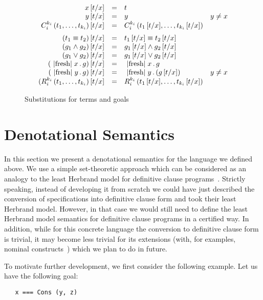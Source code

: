 \begin{figure}[t]
\[
\begin{array}{rcll}
  x\,[t/x] &=& t &\\
  y\,[t/x] &=& y & y\ne x\\
  C_i^{k_i}\,(t_1,\dots,t_{k_i})\,[t/x]&=&C_i^{k_i}\,(t_1\,[t/x],\dots,t_{k_i}\,[t/x])&\\[2mm]
  (t_1 \equiv t_2)\,[t/x]&=&t_1\,[t/x] \equiv t_2\,[t/x]&\\
  (g_1 \wedge g_2)\,[t/x]&=&g_1\,[t/x] \wedge g_2\,[t/x]&\\
  (g_1 \vee g_2)\,[t/x]&=&g_1\,[t/x] \vee g_2\,[t/x]&\\
  (\mbox{\lstinline|fresh|}\;x\,.\,g)\,[t/x]&=&\mbox{\lstinline|fresh|}\;x\,.\,g&\\
  (\mbox{\lstinline|fresh|}\;y\,.\,g)\,[t/x]&=&\mbox{\lstinline|fresh|}\;y\,.\,(g\,[t/x])&y\ne x\\
  (R_i^{k_i}\,(t_1,\dots,t_{k_i})\,[t/x]&=&R_i^{k_i}\,(t_1\,[t/x],\dots,t_{k_i}\,[t/x])&
\end{array}
\]
  \caption{Substitutions for terms and goals}
  \label{substitution}
\end{figure}

\section{Denotational Semantics}
\label{denotational}

In this section we present a denotational semantics for the language we defined above. We use a simple set-theoretic
approach which can be considered as an analogy to the least Herbrand model for definitive clause programs~\cite{LHM}.
Strictly speaking, instead of developing it from scratch we could have just described the conversion of specifications
into definitive clause form and took their least Herbrand model. However, in that case we would still need to define
the least Herbrand model semantics for definitive clause programs in a certified way. In addition, while for
this concrete language the conversion to definitive clause form is trivial, it may become less trivial for
its extensions (with, for examples, nominal constructs~\cite{AlphaKanren}) which we plan to do in future.

To motivate further development, we first consider the following example. Let us have the following goal:

\begin{lstlisting}
   x === Cons (y, z)
\end{lstlisting}

